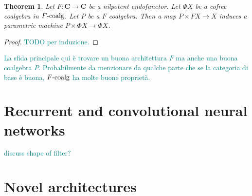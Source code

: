 \documentclass[12pt]{article}
\newtheorem{theorem}{Theorem}
\newcommand{\pietro}[1]{\textcolor{teal}{#1}}
\newcommand{\Cat}{{\mathbf{C}}}
\newcommand{\FCoalg}{{F\textnormal{-coalg}}}
\begin{document}
\begin{theorem}\label{thm:nilpotent_architecture}
    Let $F\colon \Cat \rightarrow \Cat$ be a nilpotent endofunctor. Let $\Phi X$ be a cofree coalgebra in $\FCoalg$. Let $P$ be a $F$ coalgebra. Then a map $P \times F X \rightarrow X$ induces a parametric machine $P \times \Phi X \rightarrow \Phi X$.
\end{theorem}

\begin{proof}
    \pietro{TODO per induzione.}
\end{proof}

\pietro{La sfida principale qui è trovare un buona architettura $F$ ma anche una buona coalgebra $P$. Probabilmente da menzionare da qualche parte che se la categoria di base è buona, $\FCoalg$ ha molte buone proprietà.}

\section{Recurrent and convolutional neural networks}

\pietro{discuss shape of filter?}

\section{Novel architectures}



\end{document}
